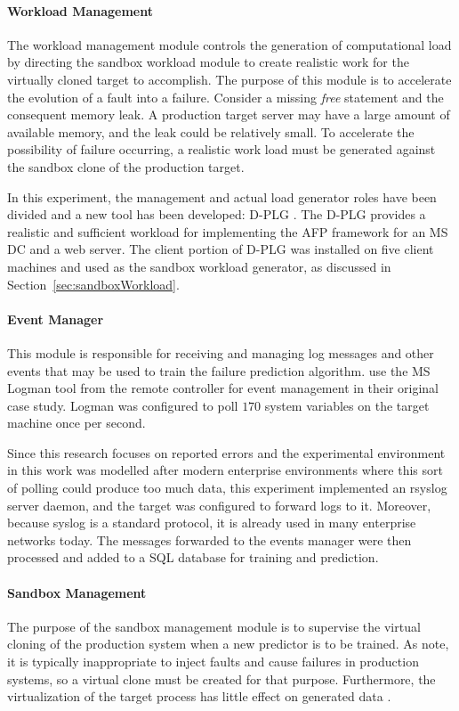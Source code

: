 \paragraph{Workload Management} \label{sec:workloadMgr} 
The workload management module controls the generation of computational load by
directing the sandbox workload module to create realistic work for the
virtually cloned target to accomplish.  The purpose of this module is to
accelerate the evolution of a fault into a failure.  Consider a missing
\emph{free} statement and the consequent memory leak.  A production target
server may have a large amount of available memory, and the leak could be
relatively small.  To accelerate the possibility of failure occurring, a
realistic work load must be generated against the sandbox clone of the
production target.

In this experiment, the management and actual load generator roles have been
divided and a new tool has been developed: \ac{D-PLG} \citep{jordan2016}.  The
\ac{D-PLG} provides a realistic and sufficient workload for implementing the
\ac{AFP} framework for an \ac{MS} \ac{DC} and a web server.  The client portion
of \ac{D-PLG} was installed on five client machines and used as the sandbox
workload generator, as discussed in Section~\ref{sec:sandboxWorkload}.

\paragraph{Event Manager} \label{sec:eventsManagerMgr}
This module is responsible for receiving and managing log messages and other
events that may be used to train the failure prediction algorithm.
\citet{irrera2015} use the \ac{MS} Logman tool from the remote controller for
event management in their original case study.  Logman was configured to poll
$170$ system variables on the target machine once per second.  

Since this research focuses on reported errors and the experimental environment
in this work was modelled after modern enterprise environments where this sort
of polling could produce too much data, this experiment implemented an rsyslog
server daemon, and the target was configured to forward logs to it.  Moreover,
because syslog is a standard protocol, it is already used in many enterprise
networks today.  The messages forwarded to the events manager were then
processed and added to a \ac{SQL} database for training and prediction.  

\paragraph{Sandbox Management} \label{sec:sandboxMgr} 
The purpose of the sandbox management module is to supervise the virtual
cloning of the production system when a new predictor is to be trained.  As
\citet{irrera2013,irrera2015} note, it is typically inappropriate to inject
faults and cause failures in production systems, so a virtual clone must be
created for that purpose.  Furthermore, the virtualization of the target
process has little effect on generated data \citep{irrera2013}.

